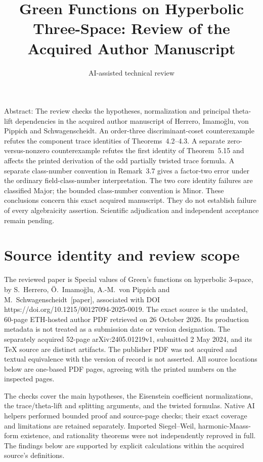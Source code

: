 \documentclass[10pt]{article}
\title{Green Functions on Hyperbolic Three-Space:
Review of the Acquired Author Manuscript}
\author{AI-assisted technical review}
\date{}
\begin{document}
\maketitle
Abstract: The review checks the hypotheses, normalization and principal theta-lift dependencies in the acquired author manuscript of Herrero, Imamoğlu, von Pippich and Schwagenscheidt. An order-three discriminant-coset counterexample refutes the component trace identities of Theorems 4.2–4.3. A separate zero-versus-nonzero counterexample refutes the first identity of Theorem 5.15 and affects the printed derivation of the odd partially twisted trace formula. A separate class-number convention in Remark 3.7 gives a factor-two error under the ordinary field-class-number interpretation. The two core identity failures are classified Major; the bounded class-number convention is Minor. These conclusions concern this exact acquired manuscript. They do not establish failure of every algebraicity assertion. Scientific adjudication and independent acceptance remain pending.\par
\section*{Source identity and review scope}
The reviewed paper is Special values of Green’s functions on hyperbolic 3-space, by S. Herrero, Ö. Imamoğlu, A.-M. von Pippich and M. Schwagenscheidt [paper], associated with DOI https://doi.org/10.1215/00127094-2025-0019. The exact source is the undated, 60-page ETH-hosted author PDF retrieved on 26 October 2026. Its production metadata is not treated as a submission date or version designation. The separately acquired 52-page arXiv:2405.01219v1, submitted 2 May 2024, and its TeX source are distinct artifacts. The publisher PDF was not acquired and textual equivalence with the version of record is not asserted. All source locations below are one-based PDF pages, agreeing with the printed numbers on the inspected pages.\par
The checks cover the main hypotheses, the Eisenstein coefficient normalizations, the trace/theta-lift and splitting arguments, and the twisted formulas. Native AI helpers performed bounded proof and source-page checks; their exact coverage and limitations are retained separately. Imported Siegel–Weil, harmonic-Maass-form existence, and rationality theorems were not independently reproved in full. The findings below are supported by explicit calculations within the acquired source’s definitions.\par
\end{document}
